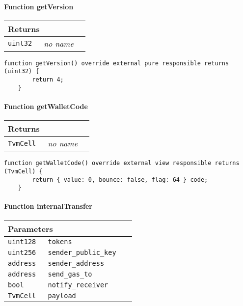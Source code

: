 \paragraph{Function getVersion}


\ifsoltables
\noindent\begin{tabular}{|l|l|p{5cm}|}\hline
\multicolumn{3}{|l|}{\bf Returns}\\\hline
\tt uint32 & {\em no name} &\\\hline
\end{tabular}
\fi

\vspace{2cm}

\begin{lstlisting}[firstnumber=54]
    function getVersion() override external pure responsible returns (uint32) {
        return 4;
    }
\end{lstlisting}

\paragraph{Function getWalletCode}


\ifsoltables
\noindent\begin{tabular}{|l|l|p{5cm}|}\hline
\multicolumn{3}{|l|}{\bf Returns}\\\hline
\tt TvmCell & {\em no name} &\\\hline
\end{tabular}
\fi

\vspace{2cm}

\begin{lstlisting}[firstnumber=87]
    function getWalletCode() override external view responsible returns (TvmCell) {
        return { value: 0, bounce: false, flag: 64 } code;
    }
\end{lstlisting}

\paragraph{Function internalTransfer}


\ifsoltables
\noindent\begin{tabular}{|l|l|p{5cm}|}\hline
\multicolumn{3}{|l|}{\bf Parameters}\\\hline
\tt uint128 & \tt tokens &\\\hline
\tt uint256 & \tt sender\_{}public\_{}key &\\\hline
\tt address & \tt sender\_{}address &\\\hline
\tt address & \tt send\_{}gas\_{}to &\\\hline
\tt bool & \tt notify\_{}receiver &\\\hline
\tt TvmCell & \tt payload &\\\hline
\end{tabular}
\fi


